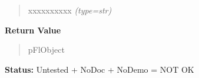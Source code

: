 \begin{boxedminipage}{\funcwidth}
\begin{quote}
\begin{Ventry}{xxxxxxxxxx}
            {\it (type=str)}

        \end{Ventry}

      \end{quote}

      \textbf{Return Value}
    \vspace{-1ex}

      \begin{quote}
      pFlObject

      \end{quote}

\textbf{Status:} Untested + NoDoc + NoDemo = NOT OK



    \end{boxedminipage}

    \label{xformslib:flbutton:fl_set_bitmapbutton_data}

    \vspace{0.5ex}

